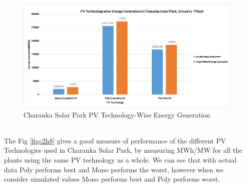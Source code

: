 \begin{figure}[H]
\centering
\includegraphics[scale=0.5]{Charanka2}
\caption{Charanka Solar Park PV Technology-Wise Energy Generation}
\label{figc2h7} %
\end{figure}
\\
The Fig \ref{figc2h8} gives a good measure of performance of the different PV Technologies used in Charanka Solar Park, by measuring MWh/MW for all the plants using the same PV technology as a whole. We can see that with actual data Poly performs best and Mono performs the worst, however when we consider simulated values Mono performs best and Poly performs worst. 
\\

